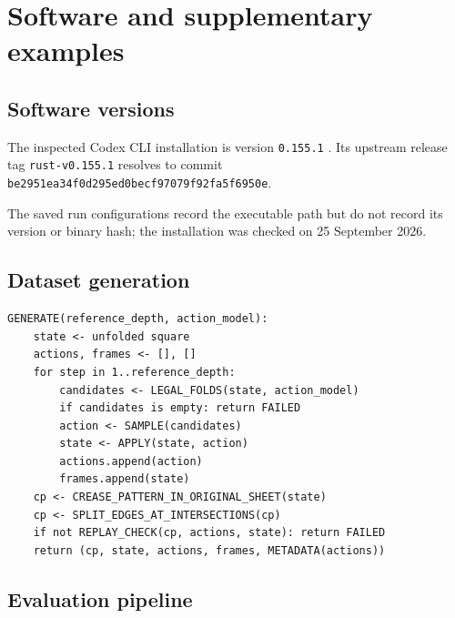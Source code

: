 \section{Software and supplementary examples}
\label{app:artifacts}

\subsection{Software versions}
\label{app:software-versions}
The inspected Codex CLI installation is version \texttt{0.155.1}
\citep{openai-codex}. Its upstream release tag \texttt{rust-v0.155.1} resolves to
commit \texttt{be2951ea34f0d295ed0becf97079f92fa5f6950e}.

The saved run configurations record the executable path but do not record its
version or binary hash; the installation was checked on 25 September 2026.



\subsection{Dataset generation}
\label{app:generation-procedure}

{\small\begin{verbatim}
GENERATE(reference_depth, action_model):
    state <- unfolded square
    actions, frames <- [], []
    for step in 1..reference_depth:
        candidates <- LEGAL_FOLDS(state, action_model)
        if candidates is empty: return FAILED
        action <- SAMPLE(candidates)
        state <- APPLY(state, action)
        actions.append(action)
        frames.append(state)
    cp <- CREASE_PATTERN_IN_ORIGINAL_SHEET(state)
    cp <- SPLIT_EDGES_AT_INTERSECTIONS(cp)
    if not REPLAY_CHECK(cp, actions, state): return FAILED
    return (cp, state, actions, frames, METADATA(actions))
\end{verbatim}
}

\subsection{Evaluation pipeline}
\label{app:evaluation-pipeline}

